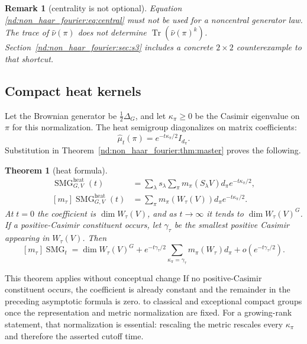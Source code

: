 \documentclass[10pt]{article}
\newcommand{\Tr}{\operatorname{Tr}}
\newcommand{\SMG}{\operatorname{SMG}}
\newcommand{\MGF}{\SMG}
\newtheorem{theorem}{Theorem}
\newtheorem{remark}{Remark}
\begin{document}
\begin{remark}[centrality is not optional]
Equation \eqref{nd:non_haar_fourier:eq:central} must not be used for a noncentral generator law.
The trace of $\widehat\nu(\pi)$ does not determine
$\Tr(\widehat\nu(\pi)^k)$.  Section~\ref{nd:non_haar_fourier:sec:s3} includes a concrete
$2\times2$ counterexample to that shortcut.
\end{remark}

\subsection{Compact heat kernels}

Let the Brownian generator be $\frac12\Delta_G$, and let $\kappa_\pi\ge0$
be the Casimir eigenvalue on $\pi$ for this normalization.  The heat
semigroup diagonalizes on matrix coefficients:
\begin{equation}\label{nd:non_haar_fourier:eq:heat-fourier}
 \widehat\mu_t(\pi)=e^{-t\kappa_\pi/2}I_{d_\pi}.
\end{equation}
Substitution in Theorem~\ref{nd:non_haar_fourier:thm:master} proves the following.

\begin{theorem}[heat formula]\label{nd:non_haar_fourier:thm:heat}
\begin{align}
 \MGF^{\mathrm{heat}}_{G,V}(t)
 &=\sum_\lambda s_\lambda
   \sum_\pi m_\pi(S_\lambda V)d_\pi e^{-t\kappa_\pi/2},
   \label{nd:non_haar_fourier:eq:heat-schur}\\
 [m_\tau]\MGF^{\mathrm{heat}}_{G,V}(t)
 &=\sum_\pi m_\pi(W_\tau(V))d_\pi e^{-t\kappa_\pi/2}.
   \label{nd:non_haar_fourier:eq:heat-monomial}
\end{align}
At $t=0$ the coefficient is $\dim W_\tau(V)$, and as $t\to\infty$ it tends
to $\dim W_\tau(V)^G$. If a positive-Casimir constituent occurs, let
$\gamma_\tau$ be the smallest positive Casimir appearing in $W_\tau(V)$.
Then
\begin{equation}\label{nd:non_haar_fourier:eq:heat-asymp}
 [m_\tau]\MGF_t=\dim W_\tau(V)^G
 +e^{-t\gamma_\tau/2}
   \sum_{\kappa_\pi=\gamma_\tau}m_\pi(W_\tau)d_\pi
 +o(e^{-t\gamma_\tau/2}).
\end{equation}
\end{theorem}

This theorem applies without conceptual change
If no positive-Casimir constituent occurs, the coefficient is already
constant and the remainder in the preceding asymptotic formula is zero.
 to classical and exceptional
compact groups once the representation and metric normalization are fixed.
For a growing-rank statement, that normalization is essential: rescaling the
metric rescales every $\kappa_\pi$ and therefore the asserted cutoff time.
\end{document}
